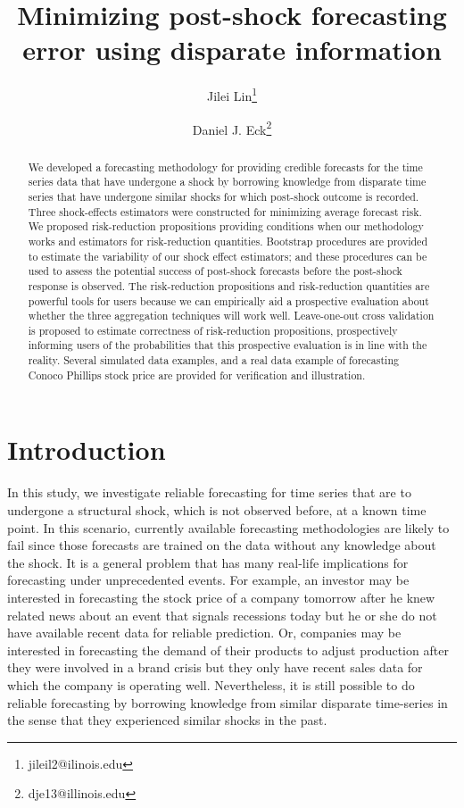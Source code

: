 \documentclass[11pt]{article}
\title{Minimizing post-shock forecasting error using disparate information}
\author{Jilei Lin\thanks{jileil2@ilinois.edu} }
\author{Daniel J. Eck\thanks{dje13@illinois.edu}}
\affil{Department of Statistics, University of Illinois at Urbana-Champaign}
\theoremstyle{definition}
\begin{document}
\maketitle
\begin{abstract}
    We developed a forecasting methodology for providing credible forecasts for the time series data that have undergone a shock  by borrowing knowledge from disparate time series that have undergone similar shocks for which post-shock outcome is recorded. Three shock-effects estimators were constructed for minimizing average forecast risk. We proposed risk-reduction propositions providing conditions when our methodology works and estimators for risk-reduction quantities. Bootstrap procedures are provided to estimate the variability of our shock effect estimators; and these procedures can be used to assess the potential success of post-shock forecasts before the post-shock response is observed. The risk-reduction propositions and risk-reduction quantities are powerful tools for users because we can empirically aid a prospective evaluation about whether the three aggregation techniques  will work well. Leave-one-out cross validation is proposed to estimate correctness of risk-reduction propositions, prospectively informing users of the probabilities that this prospective evaluation is in line with the reality. Several simulated data examples, and a real data example of forecasting Conoco Phillips stock price are provided for verification and illustration.
\end{abstract}




\section{Introduction}

In this study, we investigate reliable forecasting for  time series that are to undergone a structural shock, which is not observed before, at a known time point. In this scenario, currently available forecasting methodologies are likely to fail since those  forecasts are trained on the data without any knowledge about the shock. It is a general problem that has many real-life implications for forecasting under unprecedented events. For example, an investor may be interested in forecasting the stock price of a company tomorrow after he  knew related news about an event that signals recessions today but he or she do not have available recent data for reliable prediction. Or, companies may be interested in forecasting the demand of their products to adjust production after they were involved in a brand crisis but they only have recent sales data for which the company is operating well. Nevertheless, it is still possible to do reliable forecasting by borrowing knowledge from similar disparate time-series in the sense that they experienced similar shocks in the past.
\end{document}
